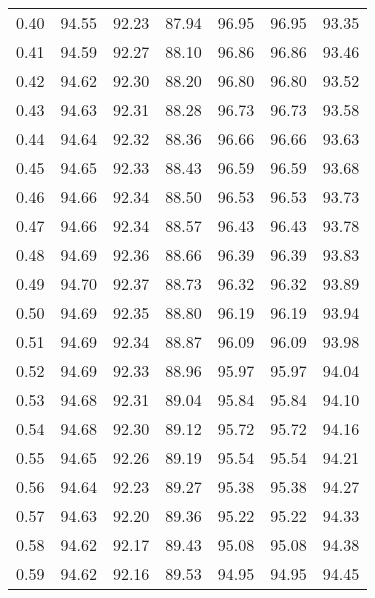 \begin{tabular}{|c|c|c|c|c|c|c|}
      0.40 &     94.55 &     92.23 &      87.94 &   96.95 &      96.95 &         93.35 \\
      0.41 &     94.59 &     92.27 &      88.10 &   96.86 &      96.86 &         93.46 \\
      0.42 &     94.62 &     92.30 &      88.20 &   96.80 &      96.80 &         93.52 \\
      0.43 &     94.63 &     92.31 &      88.28 &   96.73 &      96.73 &         93.58 \\
      0.44 &     94.64 &     92.32 &      88.36 &   96.66 &      96.66 &         93.63 \\
      0.45 &     94.65 &     92.33 &      88.43 &   96.59 &      96.59 &         93.68 \\
      0.46 &     94.66 &     92.34 &      88.50 &   96.53 &      96.53 &         93.73 \\
      0.47 &     94.66 &     92.34 &      88.57 &   96.43 &      96.43 &         93.78 \\
      0.48 &     94.69 &     92.36 &      88.66 &   96.39 &      96.39 &         93.83 \\
      0.49 &     94.70 &     92.37 &      88.73 &   96.32 &      96.32 &         93.89 \\
      0.50 &     94.69 &     92.35 &      88.80 &   96.19 &      96.19 &         93.94 \\
      0.51 &     94.69 &     92.34 &      88.87 &   96.09 &      96.09 &         93.98 \\
      0.52 &     94.69 &     92.33 &      88.96 &   95.97 &      95.97 &         94.04 \\
      0.53 &     94.68 &     92.31 &      89.04 &   95.84 &      95.84 &         94.10 \\
      0.54 &     94.68 &     92.30 &      89.12 &   95.72 &      95.72 &         94.16 \\
      0.55 &     94.65 &     92.26 &      89.19 &   95.54 &      95.54 &         94.21 \\
      0.56 &     94.64 &     92.23 &      89.27 &   95.38 &      95.38 &         94.27 \\
      0.57 &     94.63 &     92.20 &      89.36 &   95.22 &      95.22 &         94.33 \\
      0.58 &     94.62 &     92.17 &      89.43 &   95.08 &      95.08 &         94.38 \\
      0.59 &     94.62 &     92.16 &      89.53 &   94.95 &      94.95 &         94.45 \\

\end{tabular}
